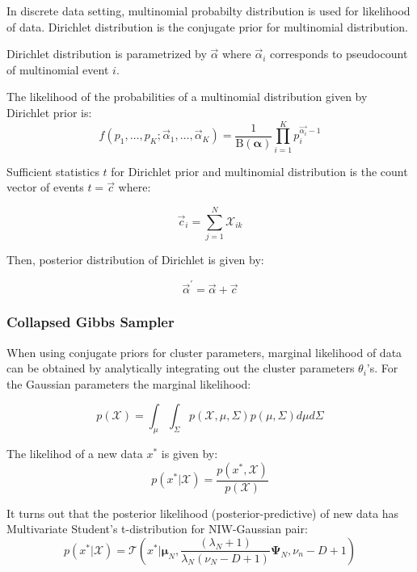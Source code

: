 \documentclass[a4paper]{article}
\begin{document}
In discrete data setting, multinomial probabilty distribution is used for likelihood of data. Dirichlet distribution is the conjugate prior for multinomial distribution.

Dirichlet distribution is parametrized by $\vec{\alpha}$ where $\vec{\alpha}_i$ corresponds to pseudocount of multinomial event $i$.

The likelihood of the probabilities of a multinomial distribution given by Dirichlet prior is:
\begin{equation*}
f(p_{1},\ldots ,p_{K};\vec{\alpha}_{1},\ldots ,\vec{\alpha}_{K})=\frac {1}{\mathrm {B} ({\boldsymbol {\alpha }})} \prod _{i=1}^{K}p_{i}^{\vec{\alpha_{i}}-1}
\end{equation*}

Sufficient statistics $t$ for Dirichlet prior and multinomial distribution is the count vector of events $t=\vec{c}$ where:

$$\vec{c}_i = \sum_{j=1}^N{\mathcal{X}_{ik}}$$

Then, posterior distribution of Dirichlet is given by:

$$\vec{\alpha}^\prime  = \vec{\alpha}+ \vec{c}$$


\subsubsection{Collapsed Gibbs Sampler}

When using conjugate priors for cluster parameters, marginal likelihood
of data can be obtained by analytically integrating out the cluster
parameters \(\theta_i\)'s. For the Gaussian parameters the marginal
likelihood:

\begin{equation*}
p(\mathcal{X}) = \int_\mu\int_\Sigma p(\mathcal{X},\mu,\Sigma)p(\mu,\Sigma)d\mu d\Sigma
\end{equation*}

The likelihod of a new data \(x^*\) is given by:
\begin{equation*}
p(x^* | \mathcal{X}) = \frac{p(x^*,\mathcal{X})}{p(\mathcal{X})}
\end{equation*}

It turns out that the posterior likelihood (posterior-predictive) of new data has Multivariate Student's t-distribution\cite{kamper2013gibbs} for NIW-Gaussian pair:
\begin{equation*}
    p(x^*|\mathcal{X}) = \mathcal{T}(x^*|\boldsymbol \mu_N,\frac{(\lambda_N+1)}{\lambda_N(\nu_N-D+1)} \boldsymbol\Psi_N,\nu_n-D+1)
\end{equation*}
\end{document}
